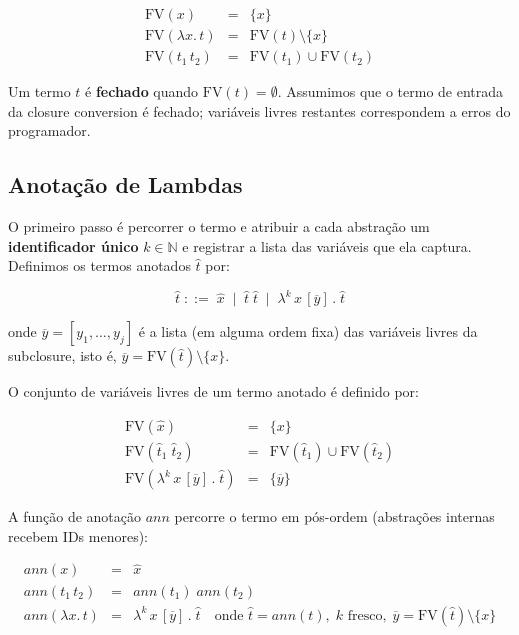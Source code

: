 \[
  \begin{array}{rcl}
    \mathrm{FV}(x)        & = & \{x\} \\
    \mathrm{FV}(\lambda x.\, t) & = & \mathrm{FV}(t) \setminus \{x\} \\
    \mathrm{FV}(t_1\, t_2) & = & \mathrm{FV}(t_1) \cup \mathrm{FV}(t_2)
  \end{array}
\]

Um termo \(t\) é \textbf{fechado} quando \(\mathrm{FV}(t) = \emptyset\).
Assumimos que o termo de entrada da closure conversion é fechado;
variáveis livres restantes correspondem a erros do programador.

\subsection{Anotação de Lambdas}

O primeiro passo é percorrer o termo e atribuir a cada abstração um
\textbf{identificador único} \(k \in \mathbb{N}\) e registrar a lista
das variáveis que ela captura. Definimos os termos anotados
\(\hat{t}\) por:

\[
  \hat{t} \;::=\; \hat{x}
  \;\mid\; \hat{t}\; \hat{t}
  \;\mid\; \lambda^k\, x\,[\overline{y}]\,.\;\hat{t}
\]

onde \(\overline{y} = [y_1, \ldots, y_j]\) é a lista (em alguma ordem
fixa) das variáveis livres da subclosure, isto é,
\(\overline{y} = \mathrm{FV}(\hat{t}) \setminus \{x\}\).

O conjunto de variáveis livres de um termo anotado é definido por:

\[
  \begin{array}{rcl}
    \mathrm{FV}(\hat{x}) & = & \{x\} \\
    \mathrm{FV}(\hat{t}_1\; \hat{t}_2) & = & \mathrm{FV}(\hat{t}_1) \cup \mathrm{FV}(\hat{t}_2) \\
    \mathrm{FV}(\lambda^k\, x\,[\overline{y}]\,.\;\hat{t}) & = & \{\overline{y}\}
  \end{array}
\]

A função de anotação \(\mathit{ann}\) percorre o termo em
pós-ordem (abstrações internas recebem IDs menores):

\[
  \begin{array}{rcl}
    \mathit{ann}(x) & = & \hat{x} \\[4pt]
    \mathit{ann}(t_1\, t_2) & = & \mathit{ann}(t_1)\;\mathit{ann}(t_2) \\[4pt]
    \mathit{ann}(\lambda x.\, t) & = &
      \lambda^k\, x\,[\overline{y}]\,.\;\hat{t}
      \quad \text{onde } \hat{t} = \mathit{ann}(t),\;
      k \text{ fresco},\;
      \overline{y} = \mathrm{FV}(\hat{t}) \setminus \{x\}
  \end{array}
\]


